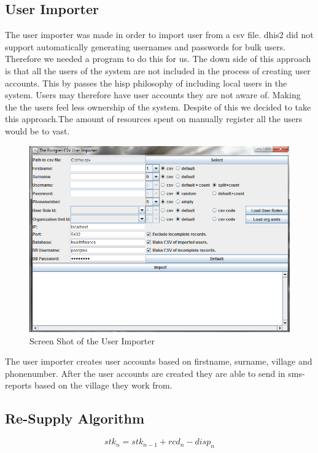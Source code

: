 \subsection{User Importer}
The user importer was made in order to import user from a csv file. \gls{dhis2} did not support automatically generating usernames and passwords for bulk users. Therefore we needed a program to do this for us. The down side of this approach is that all the users of the system are not included in the process of creating user accounts. This by passes the \gls{hisp} philosophy of including local users in the system. Users may therefore have user accounts they are not aware of. Making the the users feel less ownership of the system. Despite of this we decided to take this approach.The amount of resources spent on manually register all the users would be to vast. 	

\begin{figure}
\centering
\includegraphics[width=\textwidth]{case/img/userImporterScreenShot}
\caption{Screen Shot of the User Importer}
\label{fig:screenUser}
\end{figure}

The user importer creates user accounts based on firstname, surname, village and phonenumber. After the user accounts are created they are able to send in \gls{sms}-reports based on the village they work from. 

\subsection{Re-Supply Algorithm}

\begin{equation}
stk_{n} = stk_{n-1} + rcd_{n} - disp_{n}
\end{equation}

